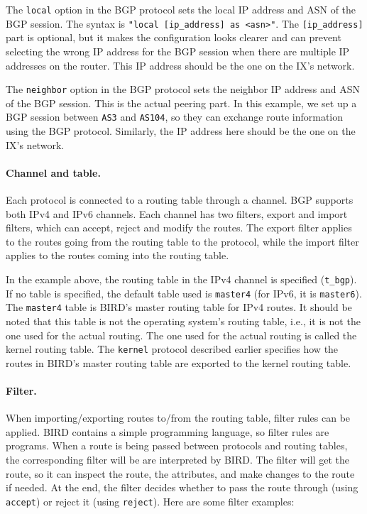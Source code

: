 The \texttt{local} option in the BGP protocol sets the local IP address and ASN of the BGP session.
The syntax is \texttt{"local [ip\_address] as <asn>"}. The \texttt{[ip\_address]} part is optional,
but it makes the configuration looks clearer and can prevent selecting the wrong IP address for the
BGP session when there are multiple IP addresses on the router. This
IP address should be the one on the IX's network.

The \texttt{neighbor} option in the BGP protocol sets the neighbor IP address and ASN of the BGP
session. This is the actual peering part. In this example, we set up a BGP session
between \texttt{AS3} and \texttt{AS104}, so they can exchange route information using the BGP protocol.
Similarly, the IP address here should be the one on the IX's network.


\paragraph{Channel and table.}
Each protocol is connected to a routing table through a channel. 
BGP supports both IPv4 and IPv6 channels. 
Each channel has two filters, export and import filters, 
which can accept, reject and modify the routes. 
The export filter applies to the routes going from the routing table to the protocol, 
while the import filter applies to the routes coming into the routing table. 

In the example above, the routing table in the IPv4 channel is 
specified (\texttt{t\_bgp}). If no table is specified, the 
default table used is \texttt{master4} (for IPv6, it is \texttt{master6}). The 
\texttt{master4} table is BIRD's master routing table for IPv4 routes. It should 
be noted that this table is not the operating system's routing table, i.e.,
it is not the one used for the actual routing. The one used for the actual
routing is called the kernel routing table. The \texttt{kernel} protocol
described earlier specifies how the routes in  BIRD's master routing
table are exported to the kernel routing table. 

\paragraph{Filter.}
When importing/exporting routes to/from the routing table, 
filter rules can be applied. BIRD contains a simple programming language,
so filter rules are programs.
When a route is being passed between protocols and routing tables, 
the corresponding filter will be are interpreted by BIRD.
The filter will get the route, so it can inspect the route,
the attributes, and make changes to the route if needed. 
At the end, the filter decides
whether to pass the route through (using \texttt{accept}) 
or reject it (using \texttt{reject}). 
Here are some filter examples:


